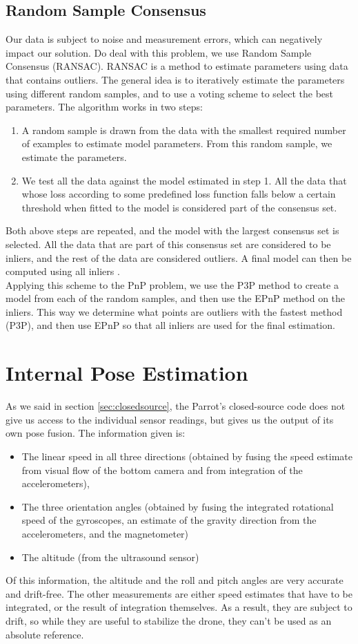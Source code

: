 \subsection{Random Sample Consensus}
Our data is subject to noise and measurement errors, which can negatively impact our solution. Do deal with this problem, we use Random Sample Consensus (RANSAC). RANSAC is a method to estimate parameters using data that contains outliers. The general idea is to iteratively estimate the parameters using different random samples, and to use a voting scheme to select the best parameters. The algorithm works in two steps:
\begin{enumerate}
  \item A random sample is drawn from the data with the smallest required number of examples to estimate model parameters. From this random sample, we estimate the parameters.
  \item We test all the data against the model estimated in step 1. All the data that whose loss according to some predefined loss function falls below a certain threshold when fitted to the model is considered part of the consensus set.
\end{enumerate}
Both above steps are repeated, and the model with the largest consensus set is selected. All the data that are part of this consensus set are considered to be inliers, and the rest of the data are considered outliers. A final model can then be computed using all inliers \cite{ransac}.\\

Applying this scheme to the PnP problem, we use the P3P method to create a model from each of the random samples, and then use the EPnP method on the inliers. This way we determine what points are outliers with the fastest method (P3P), and then use EPnP so that all inliers are used for the final estimation.

\section{Internal Pose Estimation}
As we said in section \ref{sec:closedsource}, the Parrot's closed-source code does not give us access to the individual sensor readings, but gives us the output of its own pose fusion. The information given is:
\begin{itemize}
\item The linear speed in all three directions (obtained by fusing the speed estimate from visual flow of the bottom camera and from integration of the accelerometers),
\item The three orientation angles (obtained by fusing the integrated rotational speed of the gyroscopes, an estimate of the gravity direction from the accelerometers, and the magnetometer)
\item The altitude (from the ultrasound sensor)
\end{itemize}
Of this information, the altitude and the roll and pitch angles are very accurate and drift-free. The other measurements are either speed estimates that have to be integrated, or the result of integration themselves. As a result, they are subject to drift, so while they are useful to stabilize the drone, they can't be used as an absolute reference.

